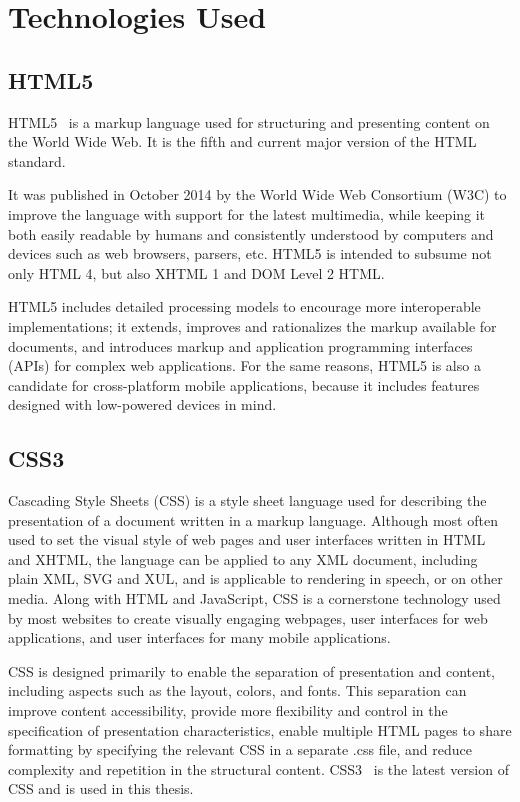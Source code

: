 \section{Technologies Used}

\subsection{HTML5}
HTML5~\cite{pilgrim2010html5} is a markup language used for structuring and presenting content on the World Wide Web. It is the fifth and current major version of the HTML standard.\par
It was published in October 2014 by the World Wide Web Consortium (W3C) to improve the language with support for the latest multimedia, while keeping it both easily readable by humans and consistently understood by computers and devices such as web browsers, parsers, etc. HTML5 is intended to subsume not only HTML 4, but also XHTML 1 and DOM Level 2 HTML.\par
HTML5 includes detailed processing models to encourage more interoperable implementations; it extends, improves and rationalizes the markup available for documents, and introduces markup and application programming interfaces (APIs) for complex web applications. For the same reasons, HTML5 is also a candidate for cross-platform mobile applications, because it includes features designed with low-powered devices in mind.

\subsection{CSS3}
Cascading Style Sheets (CSS) is a style sheet language used for describing the presentation of a document written in a markup language. Although most often used to set the visual style of web pages and user interfaces written in HTML and XHTML, the language can be applied to any XML document, including plain XML, SVG and XUL, and is applicable to rendering in speech, or on other media. Along with HTML and JavaScript, CSS is a cornerstone technology used by most websites to create visually engaging webpages, user interfaces for web applications, and user interfaces for many mobile applications.\par
CSS is designed primarily to enable the separation of presentation and content, including aspects such as the layout, colors, and fonts. This separation can improve content accessibility, provide more flexibility and control in the specification of presentation characteristics, enable multiple HTML pages to share formatting by specifying the relevant CSS in a separate .css file, and reduce complexity and repetition in the structural content. CSS3~\cite{mcfarland2012css3} is the latest version of CSS and is used in this thesis.


